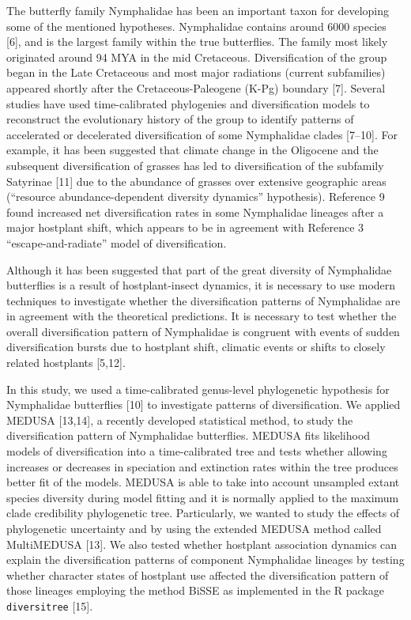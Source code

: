 \documentclass[10pt]{article}
\begin{document}
The butterfly family Nymphalidae has been an important taxon for
developing some of the mentioned hypotheses. Nymphalidae contains around
6000 species {[}6{]}, and is the largest family within the true
butterflies. The family most likely originated around 94 MYA in the mid
Cretaceous. Diversification of the group began in the Late Cretaceous
and most major radiations (current subfamilies) appeared shortly after
the Cretaceous-Paleogene (K-Pg) boundary {[}7{]}. Several studies have
used time-calibrated phylogenies and diversification models to
reconstruct the evolutionary history of the group to identify patterns
of accelerated or decelerated diversification of some Nymphalidae clades
{[}7--10{]}. For example, it has been suggested that climate change in
the Oligocene and the subsequent diversification of grasses has led to
diversification of the subfamily Satyrinae {[}11{]} due to the abundance
of grasses over extensive geographic areas (``resource
abundance-dependent diversity dynamics'' hypothesis). Reference 9 found
increased net diversification rates in some Nymphalidae lineages after a
major hostplant shift, which appears to be in agreement with Reference 3
``escape-and-radiate'' model of diversification.

Although it has been suggested that part of the great diversity of
Nymphalidae butterflies is a result of hostplant-insect dynamics, it is
necessary to use modern techniques to investigate whether the
diversification patterns of Nymphalidae are in agreement with the
theoretical predictions. It is necessary to test whether the overall
diversification pattern of Nymphalidae is congruent with events of
sudden diversification bursts due to hostplant shift, climatic events or
shifts to closely related hostplants {[}5,12{]}.

In this study, we used a time-calibrated genus-level phylogenetic
hypothesis for Nymphalidae butterflies {[}10{]} to investigate patterns
of diversification. We applied MEDUSA {[}13,14{]}, a recently developed
statistical method, to study the diversification pattern of Nymphalidae
butterflies. MEDUSA fits likelihood models of diversification into a
time-calibrated tree and tests whether allowing increases or decreases
in speciation and extinction rates within the tree produces better fit
of the models. MEDUSA is able to take into account unsampled extant
species diversity during model fitting and it is normally applied to the
maximum clade credibility phylogenetic tree. Particularly, we wanted to
study the effects of phylogenetic uncertainty and by using the extended
MEDUSA method called MultiMEDUSA {[}13{]}. We also tested whether
hostplant association dynamics can explain the diversification patterns
of component Nymphalidae lineages by testing whether character states of
hostplant use affected the diversification pattern of those lineages
employing the method BiSSE as implemented in the R package
\texttt{diversitree} {[}15{]}.
\end{document}
